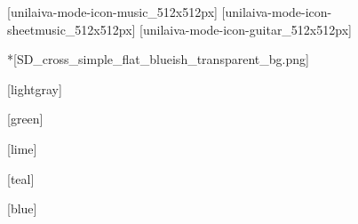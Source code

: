 
\newcommand{\subbooktitle}{a compilação completa}





              [unilaiva-mode-icon-music_512x512px]%
              [unilaiva-mode-icon-sheetmusic_512x512px]%
              [unilaiva-mode-icon-guitar_512x512px]%
  \imprintpage

  \toc

  \setcounter{chapter}{0}

  *[SD_cross_simple_flat_blueish_transparent_bg.png]
    

  [lightgray]
    \begin{songs}{}
      
    \end{songs}

  [green]
    \begin{songs}{}
      
    \end{songs}

  [lime]
    \begin{songs}{}
      
    \end{songs}

  [teal]
    \begin{songs}{}
      
    \end{songs}

  [blue]
    \begin{songs}{}
      
    \end{songs}

